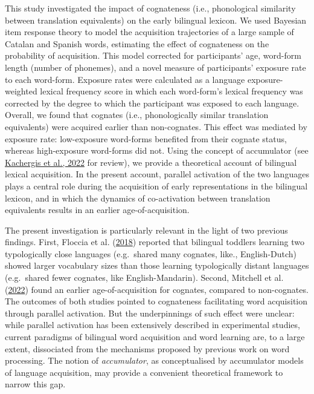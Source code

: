 \documentclass[
]{article}
\begin{document}
This study investigated the impact of cognateness (i.e., phonological
similarity between translation equivalents) on the early bilingual
lexicon. We used Bayesian item response theory to model the acquisition
trajectories of a large sample of Catalan and Spanish words, estimating
the effect of cognateness on the probability of acquisition. This model
corrected for participants' age, word-form length (number of phonemes),
and a novel measure of participants' exposure rate to each word-form.
Exposure rates were calculated as a language exposure-weighted lexical
frequency score in which each word-form's lexical frequency was
corrected by the degree to which the participant was exposed to each
language. Overall, we found that cognates (i.e., phonologically similar
translation equivalents) were acquired earlier than non-cognates. This
effect was mediated by exposure rate: low-exposure word-forms benefited
from their cognate status, whereas high-exposure word-forms did not.
Using the concept of accumulator (see
\protect\hyperlink{ref-kachergis2022standard}{Kachergis et al., 2022}
for review), we provide a theoretical account of bilingual lexical
acquisition. In the present account, parallel activation of the two
languages plays a central role during the acquisition of early
representations in the bilingual lexicon, and in which the dynamics of
co-activation between translation equivalents results in an earlier
age-of-acquisition.

The present investigation is particularly relevant in the light of two
previous findings. First, Floccia et al.
(\protect\hyperlink{ref-floccia2018introduction}{2018}) reported that
bilingual toddlers learning two typologically close languages
(e.g.~shared many cognates, like., English-Dutch) showed larger
vocabulary sizes than those learning typologically distant languages
(e.g.~shared fewer cognates, like English-Mandarin). Second, Mitchell et
al. (\protect\hyperlink{ref-mitchell2022cognates}{2022}) found an
earlier age-of-acquisition for cognates, compared to non-cognates. The
outcomes of both studies pointed to cognateness facilitating word
acquisition through parallel activation. But the underpinnings of such
effect were unclear: while parallel activation has been extensively
described in experimental studies, current paradigms of bilingual word
acquisition and word learning are, to a large extent, dissociated from
the mechanisms proposed by previous work on word processing. The notion
of \emph{accumulator}, as conceptualised by accumulator models of
language acquisition, may provide a convenient theoretical framework to
narrow this gap.
\end{document}
